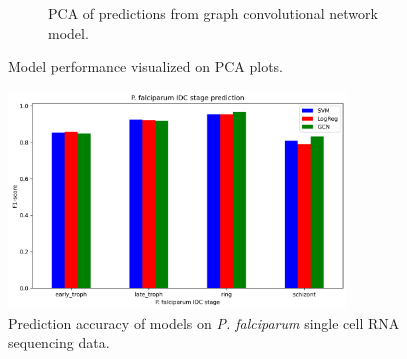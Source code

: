 \documentclass{article}
\begin{document}
\begin{figure}[htbp]
\begin{subfigure}[b]{0.3\textwidth}
      \caption{PCA of predictions from graph convolutional network model.}
      \label{fig:sub3}
  \end{subfigure}
  
  \caption{Model performance visualized on PCA plots.}
  \label{fig:main}
\end{figure}

\begin{figure}
  \centering
  \includegraphics[width=0.8\textwidth]{figures/Pf_prediction.png}
  \caption{Prediction accuracy of models on \textit{P. falciparum} single cell RNA sequencing data.}
\end{figure}


\cite{yangScBERTLargescalePretrained2022}


\end{document}
